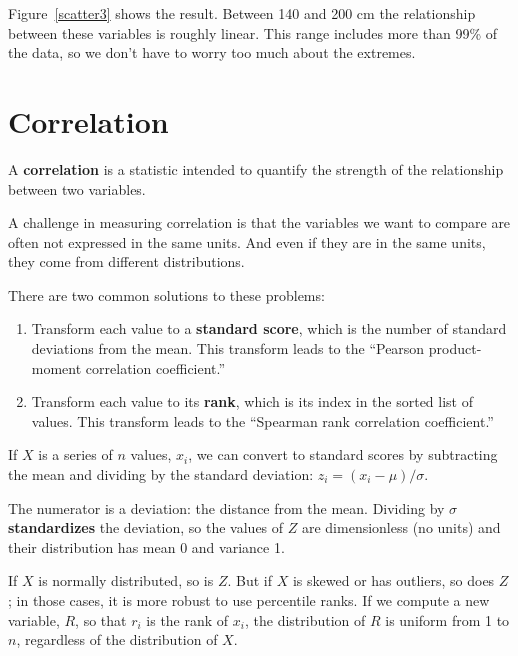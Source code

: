 \documentclass[12pt]{book}
\begin{document}
Figure~\ref{scatter3} shows the result.  Between 140 and 200 cm
the relationship between these variables is roughly linear.  This range
includes more than 99\% of the data, so we don't have to worry
too much about the extremes.


\section{Correlation}

A {\bf correlation} is a statistic intended to quantify the strength
of the relationship between two variables.

A challenge in measuring correlation is that the variables we want to
compare are often not expressed in the same units.  And even if they
are in the same units, they come from different distributions.

There are two common solutions to these problems:

\begin{enumerate}

\item Transform each value to a {\bf standard score}, which is the
number of standard deviations from the mean.  
This transform leads to
the ``Pearson product-moment correlation coefficient.''

\item Transform each value to its {\bf rank}, which is its index in
the sorted list of values.  This transform
leads to the ``Spearman rank correlation coefficient.''

\end{enumerate}

If $X$ is a series of $n$ values, $x_i$, we can convert to standard
scores by subtracting the mean and dividing by the standard deviation:
$z_i = (x_i - \mu) / \sigma$.

The numerator is a deviation: the distance from the mean.  Dividing by
$\sigma$ {\bf standardizes} the deviation, so the values of $Z$ are
dimensionless (no units) and their distribution has mean 0 and
variance 1.

If $X$ is normally distributed, so is $Z$.  But if $X$ is skewed or has
outliers, so does $Z$; in those cases, it is more robust to use
percentile ranks.  If we compute a new variable, $R$, so that $r_i$ is
the rank of $x_i$, the distribution of $R$ is uniform
from 1 to $n$, regardless of the distribution of $X$.
 
\end{document}
